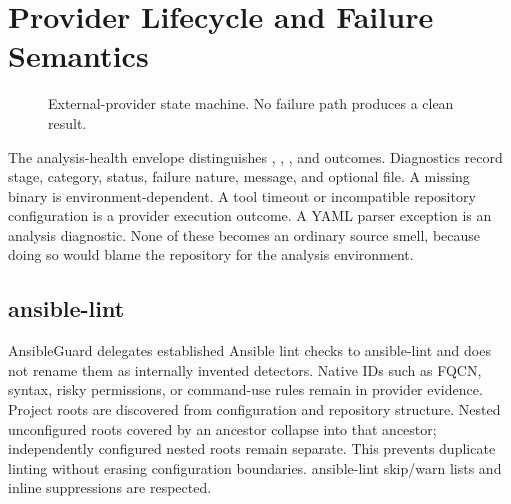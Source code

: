 \section{Provider Lifecycle and Failure Semantics}
\begin{figure}[H]
\centering
{}
\caption{External-provider state machine. No failure path produces a clean result.}
\end{figure}

The analysis-health envelope distinguishes , ,
, and  outcomes. Diagnostics record stage,
category, status, failure nature, message, and optional file. A missing binary
is environment-dependent. A tool timeout or incompatible repository
configuration is a provider execution outcome. A YAML parser exception is an
analysis diagnostic. None of these becomes an ordinary source smell, because
doing so would blame the repository for the analysis environment.

\subsection{ansible-lint}
AnsibleGuard delegates established Ansible lint checks to ansible-lint and
does not rename them as internally invented detectors. Native IDs such as FQCN,
syntax, risky permissions, or command-use rules remain in provider evidence.
Project roots are discovered from configuration and repository structure.
Nested unconfigured roots covered by an ancestor collapse into that ancestor;
independently configured nested roots remain separate. This prevents duplicate
linting without erasing configuration boundaries. ansible-lint skip/warn lists
and inline  suppressions are respected.

